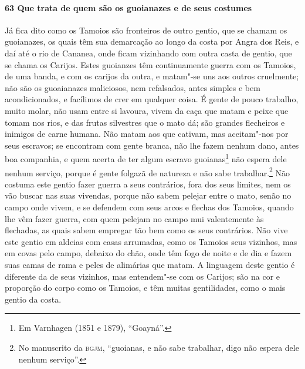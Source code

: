 \begin{linenumbers}
\paragraph{63 Que trata de quem são os guoianazes e de seus costumes} \quad
Já fica dito como os Tamoios são fronteiros de outro gentio, que se chamam os guoianazes,
os quais têm sua demarcação ao longo da costa por Angra dos Reis, e daí até o rio de
Cananea, onde ficam vizinhando com outra casta de gentio, que se chama os Carijos. Estes
guoianzes têm continuamente guerra com os Tamoios, de uma banda, e com os carijos da
outra, e matam"-se uns aos outros cruelmente; não são os guoaianazes maliciosos, nem
refalsados, antes simples e bem acondicionados, e facílimos de crer em qualquer coisa. É
gente de pouco trabalho, muito molar, não usam entre si lavoura, vivem da caça que matam e
peixe que tomam nos rios, e das frutas silvestres que o mato dá; são grandes flecheiros e
inimigos de carne humana. Não matam aos que cativam, mas aceitam"-nos por seus escravos; se
encontram com gente branca, não lhe fazem nenhum dano, antes boa companhia, e quem acerta
de ter algum escravo guoianas\footnote{ Em Varnhagen (1851 e 1879), ``Goayná''.} não
espera dele nenhum serviço, porque é gente folgazã de natureza e não sabe
trabalhar.\footnote{ No manuscrito da \textsc{bgjm}, ``guoianas, e não sabe trabalhar,
digo não espera dele nenhum serviço''.} Não costuma este gentio fazer guerra a seus
contrários, fora dos seus limites, nem os vão buscar nas suas vivendas, porque não sabem
pelejar entre o mato, senão no campo onde vivem, e se defendem com seus arcos e flechas
dos Tamoios, quando lhe vêm fazer guerra, com quem pelejam no campo mui valentemente às
flechadas, as quais sabem empregar tão bem como os seus contrários. Não vive este gentio
em aldeias com casas arrumadas, como os Tamoios seus vizinhos, mas em covas pelo campo,
debaixo do chão, onde têm fogo de noite e de dia e fazem suas camas de rama e peles de
alimárias que matam. A linguagem deste gentio é diferente da de seus vizinhos, mas
entendem"-se com os Carijos; são na cor e proporção do corpo como os Tamoios, e têm muitas
gentilidades, como o mais gentio da costa.


\end{linenumbers}
